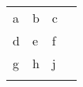 \begin{table}[h]
\centering
\begin{tabular}{|l|l|l|l} 
\cline{1-3}
a                    & b                    & c                    &   \\ 
\cline{1-3}
d                    & e                    & f                    &   \\ 
\cline{1-3}
g                    & h                    & j                    &   \\ 
\cline{1-3}
\multicolumn{1}{l}{} & \multicolumn{1}{l}{} & \multicolumn{1}{l}{} &  
\end{tabular}
\end{table}